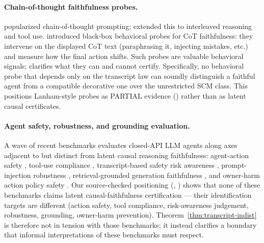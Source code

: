 \documentclass{article}
\theoremstyle{plain}
\theoremstyle{definition}
\theoremstyle{remark}
\begin{document}
\paragraph{Chain-of-thought faithfulness probes.}
\citet{wei2022cot} popularized chain-of-thought prompting; \citet{yao2023react}
extended this to interleaved reasoning and tool use. \citet{lanham2023measuring}
introduced black-box behavioral probes for CoT faithfulness: they intervene
on the displayed CoT text (paraphrasing it, injecting mistakes, etc.) and
measure how the final action shifts. Such probes are valuable behavioral
signals;  clarifies what they can and cannot
certify. Specifically, no behavioral probe that depends only on the
transcript law can soundly distinguish a faithful agent from a compatible
decorative one over the unrestricted SCM class. This positions Lanham-style
probes as PARTIAL evidence () rather than as latent
causal certificates.

\paragraph{Agent safety, robustness, and grounding evaluation.}
A wave of recent benchmarks evaluates closed-API LLM agents along axes
adjacent to but distinct from latent causal reasoning faithfulness:
agent-action safety \citep{zhang2024agentsafetybench}, tool-use compliance
\citep{xiang2024guardagent}, transcript-based safety risk awareness
\citep{yuan2024rjudge}, prompt-injection robustness
\citep{debenedetti2024agentdojo}, retrieval-grounded generation
faithfulness \citep{murphy2025faithful}, and owner-harm action policy
safety \citep{zhang2026ownerharm}. Our source-checked positioning
(, ) shows that none of these
benchmarks claims latent causal-faithfulness certification --- their
identification targets are different (action safety, tool compliance,
risk-awareness judgement, robustness, grounding, owner-harm prevention).
Theorem~\ref{thm:transcript-indist} is therefore not in tension with those
benchmarks; it instead clarifies a boundary that informal interpretations
of these benchmarks must respect.
\end{document}
